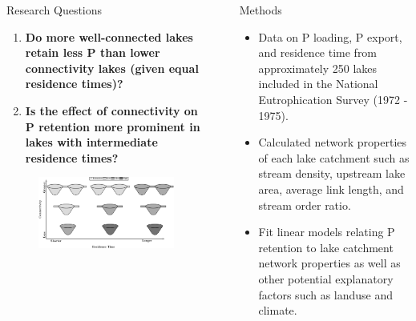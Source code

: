 \documentclass[final,hyperref={pdfpagelabels=false}]{beamer}
\begin{document}
\begin{frame}[t]
\begin{columns}[t]
\begin{column}{.465\textwidth}
{\begin{block}{Research Questions}
\begin{enumerate} \large 
\item \textbf{Do more well-connected lakes retain less P than lower connectivity lakes (given equal residence times)?}
\item \textbf{Is the effect of connectivity on P retention more prominent in lakes with intermediate residence times?}
\end{enumerate}

\vspace{2em}

\begin{figure}
  \includegraphics[width=\linewidth]{conny_framework.png}
\end{figure}

\end{block}
}


\end{column} %

\begin{column}{.03\textwidth}\end{column} %
 
\begin{column}{.465\textwidth} %

\begin{block}{Methods}

\begin{itemize}
\item Data on P loading, P export, and residence time from approximately 250 lakes included in the National Eutrophication Survey (1972 - 1975)\cite{StachelekNationalEutrophicationSurvey2017}.
\vspace{1em}
\item Calculated network properties of each lake catchment such as stream density, upstream lake area, average link length, and stream order ratio.
\vspace{1em}
\item Fit linear models relating P retention to lake catchment network properties as well as other potential explanatory factors such as landuse and climate.


\end{itemize}
\end{block}
\end{column}
\end{columns}
\end{frame}
\end{document}
